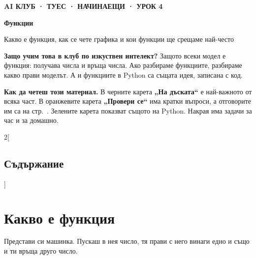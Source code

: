 \documentclass[11pt,a4paper]{article}
\begin{document}
{\small\bfseries\color{cblue} AI КЛУБ · ТУЕС · НАЧИНАЕЩИ · УРОК 4}\par\vspace{2pt}
{\fontsize{30}{34}\selectfont\bfseries Функции}\par\vspace{4pt}
{\large Какво е функция, как се чете графика и кои функции ще срещаме най-често}\par
\vspace{8pt}


\vspace{4pt}
\textbf{Защо учим това в клуб по изкуствен интелект?} Защото всеки модел е функция: получава числа и връща числа.
Ако разбираме функциите, разбираме какво прави моделът. А и функциите в Python са същата идея, записана с код.

\textbf{Как да четеш този материал.} В черните карета \textbf{„На дъската“} е най-важното от всяка част.
В оранжевите карета \textbf{„Провери се“} има кратки въпроси, а отговорите им са на стр.~\pageref{sec:answers}.
Зелените карета показват същото на Python. Накрая има задачи за час и за домашно.

\setcounter{tocdepth}{1}
{\small\setlength{\parskip}{0pt}
\raggedcolumns\begin{multicols}{2}[\subsection*{Съдържание}]
\makeatletter{}\makeatother
\end{multicols}}

\newpage
\section{Какво е функция}

Представи си машинка. Пускаш в нея число, тя прави с него винаги едно и също и ти връща друго число.
\end{document}
